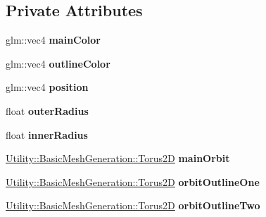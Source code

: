 \subsection*{Private Attributes}
\begin{DoxyCompactItemize}
\item 
\hypertarget{class_satellite_orbit_a27407c110c634593681d40d65299ffa2}{glm\-::vec4 {\bfseries main\-Color}}\label{class_satellite_orbit_a27407c110c634593681d40d65299ffa2}

\item 
\hypertarget{class_satellite_orbit_a5e2476ef19019e85116f22db6fbc9597}{glm\-::vec4 {\bfseries outline\-Color}}\label{class_satellite_orbit_a5e2476ef19019e85116f22db6fbc9597}

\item 
\hypertarget{class_satellite_orbit_aae8c623dc6a1135c926211a34ef7af40}{glm\-::vec4 {\bfseries position}}\label{class_satellite_orbit_aae8c623dc6a1135c926211a34ef7af40}

\item 
\hypertarget{class_satellite_orbit_ada105d15b9e2e24c6cfde0944865481f}{float {\bfseries outer\-Radius}}\label{class_satellite_orbit_ada105d15b9e2e24c6cfde0944865481f}

\item 
\hypertarget{class_satellite_orbit_a75b4bfa955f9a54887fffdf48abd3643}{float {\bfseries inner\-Radius}}\label{class_satellite_orbit_a75b4bfa955f9a54887fffdf48abd3643}

\item 
\hypertarget{class_satellite_orbit_ab6b56d30bb724b8a6c8dcd3727309d23}{\hyperlink{class_utility_1_1_basic_mesh_generation_1_1_torus2_d}{Utility\-::\-Basic\-Mesh\-Generation\-::\-Torus2\-D} {\bfseries main\-Orbit}}\label{class_satellite_orbit_ab6b56d30bb724b8a6c8dcd3727309d23}

\item 
\hypertarget{class_satellite_orbit_adc8148f6b4e4e46c21b6152512684c0e}{\hyperlink{class_utility_1_1_basic_mesh_generation_1_1_torus2_d}{Utility\-::\-Basic\-Mesh\-Generation\-::\-Torus2\-D} {\bfseries orbit\-Outline\-One}}\label{class_satellite_orbit_adc8148f6b4e4e46c21b6152512684c0e}

\item 
\hypertarget{class_satellite_orbit_a0d9b0838422d4ec70af40b626e7d79a3}{\hyperlink{class_utility_1_1_basic_mesh_generation_1_1_torus2_d}{Utility\-::\-Basic\-Mesh\-Generation\-::\-Torus2\-D} {\bfseries orbit\-Outline\-Two}}\label{class_satellite_orbit_a0d9b0838422d4ec70af40b626e7d79a3}

\end{DoxyCompactItemize}


